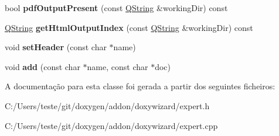 \begin{DoxyCompactItemize}
\item 
\hypertarget{class_expert_a602272e20aa140da019705532c7e80ba}{bool {\bfseries pdf\-Output\-Present} (const \hyperlink{class_q_string}{Q\-String} \&working\-Dir) const }\label{class_expert_a602272e20aa140da019705532c7e80ba}

\item 
\hypertarget{class_expert_a25ebc73d404aeaffb78ac0608637ebbc}{\hyperlink{class_q_string}{Q\-String} {\bfseries get\-Html\-Output\-Index} (const \hyperlink{class_q_string}{Q\-String} \&working\-Dir) const }\label{class_expert_a25ebc73d404aeaffb78ac0608637ebbc}

\item 
\hypertarget{class_expert_ab443f5d6063a4253a86e3175235718a6}{void {\bfseries set\-Header} (const char $\ast$name)}\label{class_expert_ab443f5d6063a4253a86e3175235718a6}

\item 
\hypertarget{class_expert_a0cc68b0b84a379aeeda8da77e2c42706}{void {\bfseries add} (const char $\ast$name, const char $\ast$doc)}\label{class_expert_a0cc68b0b84a379aeeda8da77e2c42706}

\end{DoxyCompactItemize}


A documentação para esta classe foi gerada a partir dos seguintes ficheiros\-:\begin{DoxyCompactItemize}
\item 
C\-:/\-Users/teste/git/doxygen/addon/doxywizard/expert.\-h\item 
C\-:/\-Users/teste/git/doxygen/addon/doxywizard/expert.\-cpp\end{DoxyCompactItemize}
